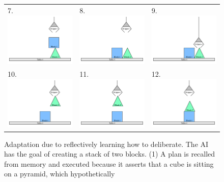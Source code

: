 \begin{figure}
\begin{tabular}{p{3.5cm}p{3.5cm}p{3.5cm}}
7. \includegraphics[width=3.5cm]{gfx/blocks_world_example-7}  & 8. \includegraphics[width=3.5cm]{gfx/blocks_world_example-8}  & 9. \includegraphics[width=3.5cm]{gfx/blocks_world_example-9} \\
10. \includegraphics[width=3.5cm]{gfx/blocks_world_example-10} & 11. \includegraphics[width=3.5cm]{gfx/blocks_world_example-11} & 12. \includegraphics[width=3.5cm]{gfx/blocks_world_example-12}
\end{tabular}
\caption[Adaptation due to reflectively learning how to
  deliberate.]{Adaptation due to reflectively learning how to
  deliberate.  The AI has the goal of creating a stack of two blocks.
  (1) A plan is recalled from memory and executed because it asserts
  that a cube is sitting on a pyramid, which hypothetically
}
\end{figure}
